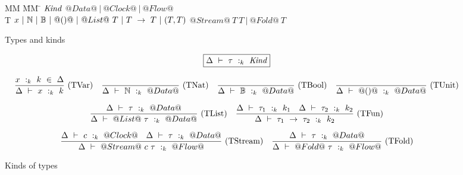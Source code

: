 
\begin{figure*}

\begin{tabbing}
MM \= MM \= \kill
$\mathit{Kind}$
\GrammarDef $@Data@~|~@Clock@~|~@Flow@$ \\

T
\GrammarDef $x~|~\mathbb{N}~|~\mathbb{B}~|~@()@
    ~|~ @List@~T
    ~|~ T~\to~T
    ~|~ (T,T)$
\GrammarAlt $@Stream@~T~T
    ~|~ @Fold@~T$
    \\
\end{tabbing}

\caption{Types and kinds}
\label{fig:source:type:types}
\end{figure*}


\begin{figure*}

$$
\boxed{\Delta~\vdash~\tau~:_k~\mathit{Kind}}
$$

$$
\enskip \frac {\displaystyle 
    x~:_k~k~\in~\Delta
} {\displaystyle 
    \Delta~\vdash~x~:_k~k
} \  \mbox{(TVar)} \enskip
\enskip \frac {\displaystyle } {\displaystyle 
    \Delta~\vdash~\mathbb{N}~:_k~@Data@
} \  \mbox{(TNat)} \enskip
\enskip \frac {\displaystyle } {\displaystyle 
    \Delta~\vdash~\mathbb{B}~:_k~@Data@
} \  \mbox{(TBool)} \enskip
\enskip \frac {\displaystyle } {\displaystyle 
    \Delta~\vdash~@()@~:_k~@Data@
} \  \mbox{(TUnit)} \enskip
$$

$$
\enskip \frac {\displaystyle 
    \Delta~\vdash~\tau~:_k~@Data@
} {\displaystyle 
    \Delta~\vdash~@List@~\tau~:_k~@Data@
} \  \mbox{(TList)} \enskip
\enskip \frac {\displaystyle 
    \Delta~\vdash~\tau_1~:_k~k_1
    \quad
    \Delta~\vdash~\tau_2~:_k~k_2
} {\displaystyle 
    \Delta~\vdash~\tau_1~\to~\tau_2~:_k~k_2
} \  \mbox{(TFun)} \enskip
$$

$$
\enskip \frac {\displaystyle 
    \Delta~\vdash~c~:_k~@Clock@
    \quad
    \Delta~\vdash~\tau~:_k~@Data@
} {\displaystyle 
    \Delta~\vdash~@Stream@~c~\tau~:_k~@Flow@
} \  \mbox{(TStream)} \enskip
\enskip \frac {\displaystyle 
    \Delta~\vdash~\tau~:_k~@Data@
} {\displaystyle 
    \Delta~\vdash~@Fold@~\tau~:_k~@Flow@
} \  \mbox{(TFold)} \enskip
$$



\caption{Kinds of types}
\label{fig:source:type:kinds}
\end{figure*}


